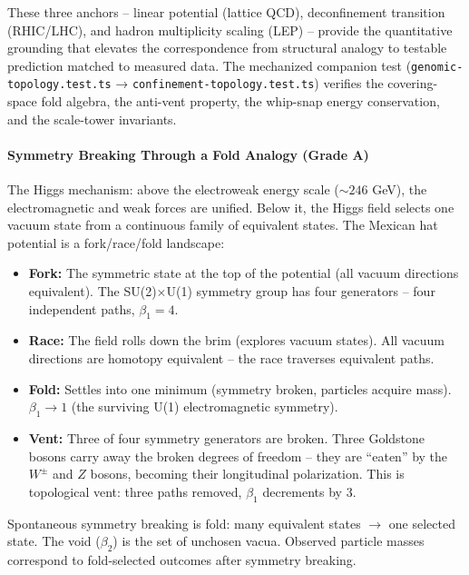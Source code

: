 \documentclass[
  11pt,
]{article}
\begin{document}
These three anchors -- linear potential (lattice QCD), deconfinement
transition (RHIC/LHC), and hadron multiplicity scaling (LEP) -- provide
the quantitative grounding that elevates the correspondence from
structural analogy to testable prediction matched to measured data. The
mechanized companion test (\texttt{genomic-topology.test.ts} →
\texttt{confinement-topology.test.ts}) verifies the covering-space fold
algebra, the anti-vent property, the whip-snap energy conservation, and
the scale-tower invariants.

\paragraph{Symmetry Breaking Through a Fold Analogy (Grade
A)}\label{symmetry-breaking-through-a-fold-analogy-grade-a}

The Higgs mechanism: above the electroweak energy scale (\(\sim 246\)
GeV), the electromagnetic and weak forces are unified. Below it, the
Higgs field selects one vacuum state from a continuous family of
equivalent states. The Mexican hat potential is a fork/race/fold
landscape:

\begin{itemize}
\item
  \textbf{Fork:} The symmetric state at the top of the potential (all
  vacuum directions equivalent). The SU(2)×U(1) symmetry group has four
  generators -- four independent paths, \(\beta_1 = 4\).
\item
  \textbf{Race:} The field rolls down the brim (explores vacuum states).
  All vacuum directions are homotopy equivalent -- the race traverses
  equivalent paths.
\item
  \textbf{Fold:} Settles into one minimum (symmetry broken, particles
  acquire mass). \(\beta_1 \to 1\) (the surviving U(1) electromagnetic
  symmetry).
\item
  \textbf{Vent:} Three of four symmetry generators are broken. Three
  Goldstone bosons carry away the broken degrees of freedom -- they are
  ``eaten'' by the \(W^\pm\) and \(Z\) bosons, becoming their
  longitudinal polarization. This is topological vent: three paths
  removed, \(\beta_1\) decrements by 3.
\end{itemize}

Spontaneous symmetry breaking is fold: many equivalent states \(\to\)
one selected state. The void (\(\beta_2\)) is the set of unchosen vacua.
Observed particle masses correspond to fold-selected outcomes after
symmetry breaking.
\end{document}

